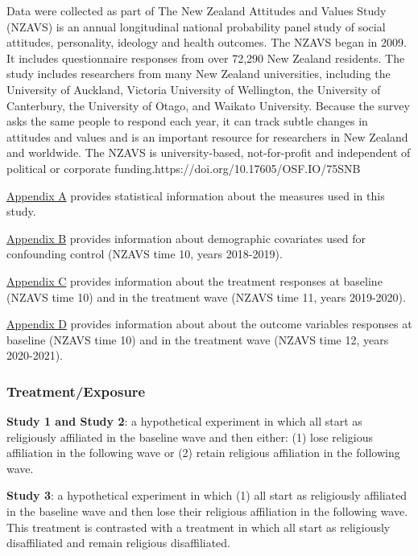 \documentclass[
  singlecolumn]{article}
\begin{document}
Data were collected as part of The New Zealand Attitudes and Values
Study (NZAVS) is an annual longitudinal national probability panel study
of social attitudes, personality, ideology and health outcomes. The
NZAVS began in 2009. It includes questionnaire responses from over
72,290 New Zealand residents. The study includes researchers from many
New Zealand universities, including the University of Auckland, Victoria
University of Wellington, the University of Canterbury, the University
of Otago, and Waikato University. Because the survey asks the same
people to respond each year, it can track subtle changes in attitudes
and values and is an important resource for researchers in New Zealand
and worldwide. The NZAVS is university-based, not-for-profit and
independent of political or corporate
funding.https://doi.org/10.17605/OSF.IO/75SNB

\hyperref[appendix-measures]{Appendix A} provides statistical
information about the measures used in this study.

\hyperref[appendix-demographics]{Appendix B} provides information about
demographic covariates used for confounding control (NZAVS time 10,
years 2018-2019).

\hyperref[appendix-exposures]{Appendix C} provides information about the
treatment responses at baseline (NZAVS time 10) and in the treatment
wave (NZAVS time 11, years 2019-2020).

\hyperref[appendix-outcomes]{Appendix D} provides information about
about the outcome variables responses at baseline (NZAVS time 10) and in
the treatment wave (NZAVS time 12, years 2020-2021).

\subsubsection{Treatment/Exposure}\label{treatmentexposure}

\textbf{Study 1 and Study 2}: a hypothetical experiment in which all
start as religiously affiliated in the baseline wave and then either:
(1) lose religious affiliation in the following wave or (2) retain
religious affiliation in the following wave.

\textbf{Study 3}: a hypothetical experiment in which (1) all start as
religiously affiliated in the baseline wave and then lose their
religious affiliation in the following wave. This treatment is
contrasted with a treatment in which all start as religiously
disaffiliated and remain religious disaffiliated.
\end{document}
